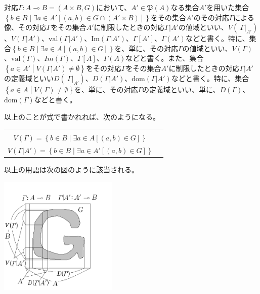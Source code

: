 \documentclass[a4paper]{jsarticle}
\begin{document}
\begin{dfn}
対応$\varGamma:A \multimap B = (A \times B,G)$において、$A'\in \mathfrak{P}(A)$なる集合$A'$を用いた集合$\left\{ b \in B \middle| \exists a \in A'\left[ (a,b) \in G \cap \left( A' \times B \right) \right] \right\}$をその集合$A'$のその対応$\varGamma$による像、その対応$\varGamma$をその集合$A'$に制限したときの対応$\varGamma|A'$の値域といい、$V\left( \left. \ \varGamma \right|_{A'} \right)$、$V\left( \varGamma|A' \right)$、$\mathrm{val}\left( \varGamma|A' \right)$、$\mathrm{Im}\left( \varGamma|A' \right)$、$\varGamma\left[ A' \right]$、$\varGamma\left( A' \right)$などと書く。特に、集合$\left\{ b \in B \middle| \exists a \in A\left[ (a,b) \in G \right] \right\}$を、単に、その対応$\varGamma$の値域といい、$V(\varGamma)$、$\mathrm{val}(\varGamma)$、$Im(\varGamma)$、$\varGamma[ A]$、$\varGamma(A)$などと書く。また、集合$\left\{ a \in A' \middle| V\left( \varGamma|A' \right) \neq \emptyset \right\}$をその対応$\varGamma$をその集合$A'$に制限したときの対応$\varGamma|A'$の定義域といい$D\left( \left. \ \varGamma \right|_{A'} \right)$、$D\left( \varGamma|A' \right)$、$\mathrm{dom}\left( \varGamma|A' \right)$などと書く。特に、集合$\left\{ a \in A \middle| V(\varGamma) \neq \emptyset \right\}$を、単に、その対応$\varGamma$の定義域といい、単に、$D(\varGamma)$、$\mathrm{dom}(\varGamma)$などと書く。\par
以上のことが式で書かれれば、次のようになる。
\begin{longtable}[c]{cc}
\hspace{-0.5em}\begin{tabular}{l}
$D(\varGamma) = \left\{ a \in A \middle| V(\varGamma) \neq \emptyset \right\} $\\
$V(\varGamma) = \left\{ b \in B \middle| \exists a \in A\left[ (a,b) \in G \right] \right\} $
\end{tabular} & \hspace{-0.5em}\begin{tabular}{l}
$D\left( \varGamma|A' \right) = \left\{ a \in A \middle| V\left( \varGamma|A' \right) \neq \emptyset \right\} $\\
$V\left( \varGamma|A' \right) = \left\{ b \in B \middle| \exists a \in A'\left[ (a,b) \in G \right] \right\} $ 
\end{tabular} \\
\end{longtable}
\end{dfn}
以上の用語は次の図のように該当される。
\begin{center}
\includegraphics[width=160pt]{1.2.1.a.png}
\end{center}
\end{document}
